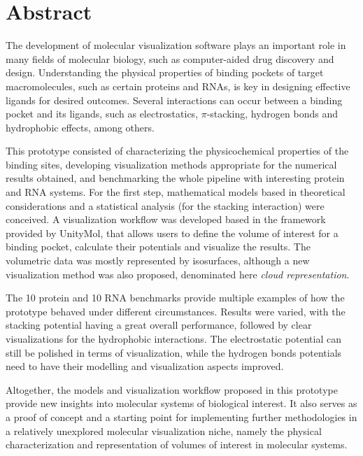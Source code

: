 \chapter*{Abstract} %

The development of molecular visualization software plays an important role in many fields of molecular biology, such as computer-aided drug discovery and design. Understanding the physical properties of binding pockets of target macromolecules, such as certain proteins and RNAs, is key in designing effective ligands for desired outcomes. Several interactions can occur between a binding pocket and its ligands, such as electrostatics, $\pi$-stacking, hydrogen bonds and hydrophobic effects, among others.

This prototype consisted of characterizing the physicochemical properties of the binding sites, developing visualization methods appropriate for the numerical results obtained, and benchmarking the whole pipeline with interesting protein and RNA systems. For the first step, mathematical models based in theoretical considerations and a statistical analysis (for the stacking interaction) were conceived. A visualization workflow was developed based in the framework provided by UnityMol, that allows users to define the volume of interest for a binding pocket, calculate their potentials and visualize the results. The volumetric data was mostly represented by isosurfaces, although a new visualization method was also proposed, denominated here \textit{cloud representation}.

The 10 protein and 10 RNA benchmarks provide multiple examples of how the prototype behaved under different circumstances. Results were varied, with the stacking potential having a great overall performance, followed by clear visualizations for the hydrophobic interactions. The electrostatic potential can still be polished in terms of visualization, while the hydrogen bonds potentials need to have their modelling and visualization aspects improved.

Altogether, the models and visualization workflow proposed in this prototype provide new insights into molecular systems of biological interest. It also serves as a proof of concept and a starting point for implementing further methodologies in a relatively unexplored molecular visualization niche, namely the physical characterization and representation of volumes of interest in molecular systems.
